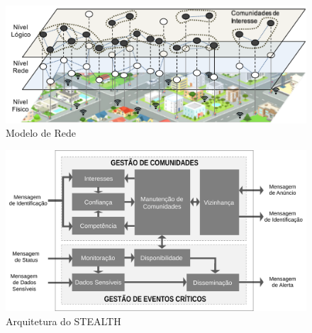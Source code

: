 \documentclass[12pt]{article}
\begin{document}
\vspace{-0.5cm}
\noindent
\begin{minipage}[b]{.48\linewidth}
\centering
\begin{figure}[H]
\centering
\includegraphics[width=1\textwidth]{figures/ModeloRede.pdf}
\caption{Modelo de Rede}
\label{fig:modeloRede}
\end{figure}
\end{minipage}
\begin{minipage}[b]{.52\linewidth}
\begin{figure}[H]
\centering
\includegraphics[width=1\textwidth]{figures/Arquitetura_8_p.pdf}
\caption{Arquitetura do \mbox{STEALTH}}
\label{fig:ArquiteturaStealth}
\end{figure}
\end{minipage}
\end{document}
